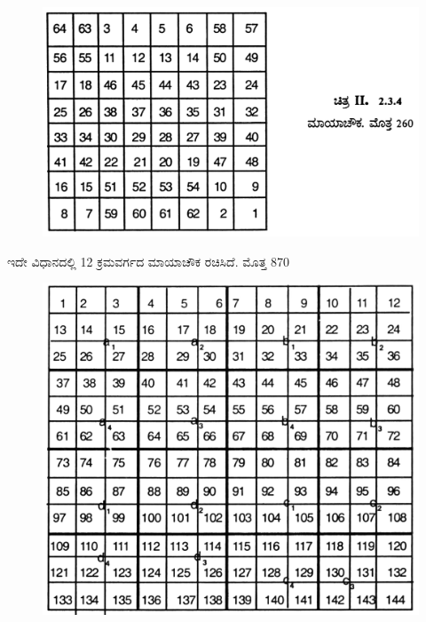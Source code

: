\begin{figure}[H]
\includegraphics[scale=.9]{src/figures/chap3/fig3-27.jpg}
\end{figure}
ಇದೇ ವಿಧಾನದಲ್ಲಿ 12 ಕ್ರಮವರ್ಗದ ಮಾಯಾಚೌಕ ರಚಿಸಿದೆ. ಮೊತ್ತ 870
\begin{figure}[H]
\includegraphics{src/figures/chap3/fig3-28.jpg}
\end{figure}
